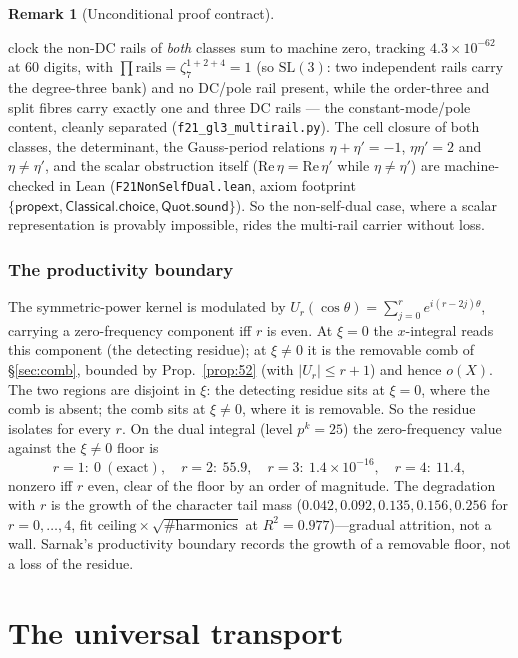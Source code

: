 \documentclass[11pt]{article}
\newcommand{\inst}[1]{%
\samnote{INSTRUCTION: #1}%
}
\theoremstyle{definition}
\newtheorem{remark}[theorem]{Remark}
\begin{document}
\begin{remark}[Unconditional proof contract]
\begin{enumerate}
clock the non-DC rails of \emph{both} classes sum to machine zero, tracking $4.3\times10^{-62}$ at $60$ digits,
with $\prod\text{rails}=\zeta_7^{1+2+4}=1$ (so $\mathrm{SL}(3)$: two independent rails carry the degree-three
bank) and no DC/pole rail present, while the order-three and split fibres carry exactly one and three DC rails ---
the constant-mode/pole content, cleanly separated (\texttt{f21\_gl3\_multirail.py}). The cell closure of both
classes, the determinant, the Gauss-period relations $\eta+\eta'=-1$, $\eta\eta'=2$ and $\eta\ne\eta'$, and the
scalar obstruction itself ($\mathrm{Re}\,\eta=\mathrm{Re}\,\eta'$ while $\eta\ne\eta'$) are machine-checked in Lean
(\texttt{F21NonSelfDual.lean}, axiom footprint $\{\mathsf{propext},\allowbreak\mathsf{Classical.choice},\allowbreak
\mathsf{Quot.sound}\}$). So the non-self-dual case, where a scalar representation is provably impossible, rides the
multi-rail carrier without loss.

\section{The productivity boundary}\label{sec:sarnak}

The symmetric-power kernel is modulated by $U_r(\cos\theta)=\sum_{j=0}^r e^{i(r-2j)\theta}$, carrying
a zero-frequency component iff $r$ is even. At $\xi=0$ the $x$-integral reads this component (the
detecting residue); at $\xi\neq0$ it is the removable comb of \S\ref{sec:comb}, bounded by
Prop.~\ref{prop:52} (with $|U_r|\le r+1$) and hence $o(X)$. The two regions are disjoint in $\xi$:
the detecting residue sits at $\xi=0$, where the comb is absent; the comb sits at $\xi\neq0$, where it
is removable. So the residue isolates for every $r$. On the dual integral (level $p^k=25$) the
zero-frequency value against the $\xi\neq0$ floor is
\[
  r=1:\ 0\ (\text{exact}),\quad r=2:\ 55.9,\quad r=3:\ 1.4\times10^{-16},\quad r=4:\ 11.4,
\]
nonzero iff $r$ even, clear of the floor by an order of magnitude. The degradation with $r$ is the
growth of the character tail mass ($0.042,0.092,0.135,0.156,0.256$ for $r=0,\dots,4$, fit
$\text{ceiling}\times\sqrt{\#\text{harmonics}}$ at $R^2=0.977$)---gradual attrition, not a wall.
Sarnak's productivity boundary \cite[fn.~5]{AltIII} records the growth of a removable floor, not a
loss of the residue.

\part{The universal transport} \inst{this should be first}


\end{enumerate}
\end{remark}
\end{document}

